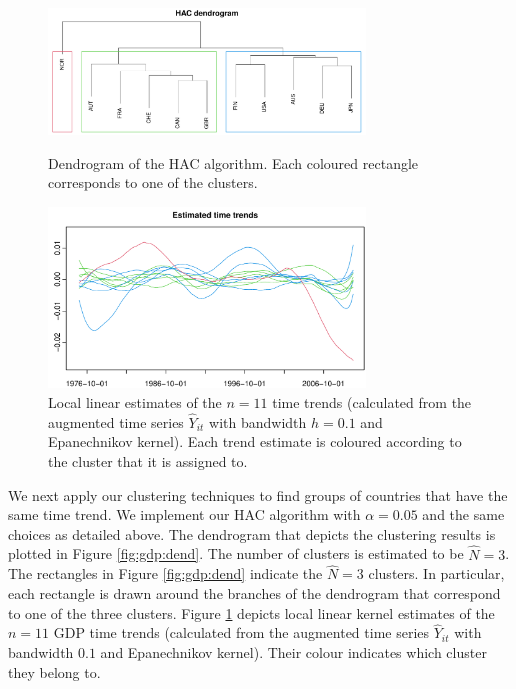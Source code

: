 \documentclass[12pt]{article}
\begin{document}
\begin{figure}[t!]
\begin{center}
\includegraphics[width=0.75\textwidth]{../output/plots/gdp/dendrogram}
\caption{Dendrogram of the HAC algorithm. Each coloured rectangle corresponds to one of the clusters.}\label{fig:gdp:dend}

\includegraphics[width=0.75\textwidth]{../output/plots/gdp/all_clusters}
\caption{Local linear estimates of the $n=11$ time trends (calculated from the augmented time series $\widehat{Y}_{it}$ with bandwidth $h = 0.1$ and Epanechnikov kernel). Each trend estimate is coloured according to the cluster that it is assigned to. }\label{fig:gdp:all_clusters}
\end{center}
\end{figure}


We next apply our clustering techniques to find groups of countries that have the same time trend. We implement our HAC algorithm with $\alpha = 0.05$ and the same choices as detailed above. The dendrogram that depicts the clustering results is plotted in Figure \ref{fig:gdp:dend}. The number of clusters is estimated to be $\widehat{N} = 3$. The rectangles in Figure \ref{fig:gdp:dend} indicate the $\widehat{N} = 3$ clusters. In particular, each rectangle is drawn around the branches of the dendrogram that correspond to one of the three clusters. Figure \ref{fig:gdp:all_clusters} depicts local linear kernel estimates of the $n=11$ GDP time trends (calculated from the augmented time series $\widehat{Y}_{it}$ with bandwidth $0.1$ and Epanechnikov kernel). Their colour indicates which cluster they belong to. 
\end{document}
